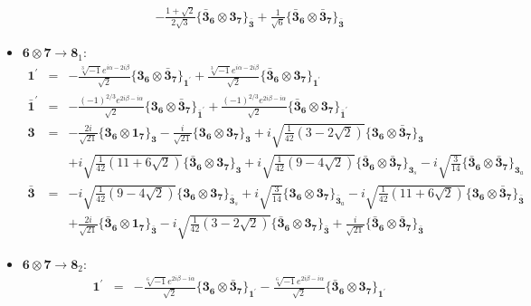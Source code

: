 \documentclass[english]{article}
\newcommand{\subcg}[3]{\big\{ {#1}\otimes{#2}\big\}^{}_{#3}}
\newcommand{\rep}[1]{\mathbf{#1}}
\begin{document}
\begin{itemize}
\begin{eqnarray*}
 & & -\frac{1+\sqrt{2}}{2 \sqrt{3}}\subcg{\rep{\bar{3}}_{\rep{6}}}{\rep{3}_{\rep{7}}}{\rep{\bar{3}}}+\frac{1}{\sqrt{6}}\subcg{\rep{\bar{3}}_{\rep{6}}}{\rep{\bar{3}}_{\rep{7}}}{\rep{\bar{3}}}
\end{eqnarray*}
\item $\rep{6}\otimes\rep{7}\to\rep{8}_{1}$:
\begin{eqnarray*}
\rep{1^{\prime}} &=& -\frac{\sqrt[3]{-1} e^{i \alpha -2 i \beta }}{\sqrt{2}}\subcg{\rep{3}_{\rep{6}}}{\rep{\bar{3}}_{\rep{7}}}{\rep{1^{\prime}}}+\frac{\sqrt[3]{-1} e^{i \alpha -2 i \beta }}{\sqrt{2}}\subcg{\rep{\bar{3}}_{\rep{6}}}{\rep{3}_{\rep{7}}}{\rep{1^{\prime}}}
\\
\rep{\bar{1}^{\prime}} &=& -\frac{(-1)^{2/3} e^{2 i \beta -i \alpha }}{\sqrt{2}}\subcg{\rep{3}_{\rep{6}}}{\rep{\bar{3}}_{\rep{7}}}{\rep{\bar{1}^{\prime}}}+\frac{(-1)^{2/3} e^{2 i \beta -i \alpha }}{\sqrt{2}}\subcg{\rep{\bar{3}}_{\rep{6}}}{\rep{3}_{\rep{7}}}{\rep{\bar{1}^{\prime}}}
\\
\rep{3} &=& -\frac{2 i}{\sqrt{21}}\subcg{\rep{3}_{\rep{6}}}{\rep{1}_{\rep{7}}}{\rep{3}}-\frac{i}{\sqrt{21}}\subcg{\rep{3}_{\rep{6}}}{\rep{3}_{\rep{7}}}{\rep{3}}+i \sqrt{\frac{1}{42} \left(3-2 \sqrt{2}\right)}\subcg{\rep{3}_{\rep{6}}}{\rep{\bar{3}}_{\rep{7}}}{\rep{3}} \\ 
 & & +i \sqrt{\frac{1}{42} \left(11+6 \sqrt{2}\right)}\subcg{\rep{\bar{3}}_{\rep{6}}}{\rep{3}_{\rep{7}}}{\rep{3}}+i \sqrt{\frac{1}{42} \left(9-4 \sqrt{2}\right)}\subcg{\rep{\bar{3}}_{\rep{6}}}{\rep{\bar{3}}_{\rep{7}}}{\rep{3}_{s}}-i \sqrt{\frac{3}{14}}\subcg{\rep{\bar{3}}_{\rep{6}}}{\rep{\bar{3}}_{\rep{7}}}{\rep{3}_{a}}
\\
\rep{\bar{3}} &=& -i \sqrt{\frac{1}{42} \left(9-4 \sqrt{2}\right)}\subcg{\rep{3}_{\rep{6}}}{\rep{3}_{\rep{7}}}{\rep{\bar{3}}_{s}}+i \sqrt{\frac{3}{14}}\subcg{\rep{3}_{\rep{6}}}{\rep{3}_{\rep{7}}}{\rep{\bar{3}}_{a}}-i \sqrt{\frac{1}{42} \left(11+6 \sqrt{2}\right)}\subcg{\rep{3}_{\rep{6}}}{\rep{\bar{3}}_{\rep{7}}}{\rep{\bar{3}}} \\ 
 & & +\frac{2 i}{\sqrt{21}}\subcg{\rep{\bar{3}}_{\rep{6}}}{\rep{1}_{\rep{7}}}{\rep{\bar{3}}}-i \sqrt{\frac{1}{42} \left(3-2 \sqrt{2}\right)}\subcg{\rep{\bar{3}}_{\rep{6}}}{\rep{3}_{\rep{7}}}{\rep{\bar{3}}}+\frac{i}{\sqrt{21}}\subcg{\rep{\bar{3}}_{\rep{6}}}{\rep{\bar{3}}_{\rep{7}}}{\rep{\bar{3}}}
\end{eqnarray*}
\item $\rep{6}\otimes\rep{7}\to\rep{8}_{2}$:
\begin{eqnarray*}
\rep{1^{\prime}} &=& -\frac{\sqrt[6]{-1} e^{2 i \beta -i \alpha }}{\sqrt{2}}\subcg{\rep{3}_{\rep{6}}}{\rep{\bar{3}}_{\rep{7}}}{\rep{1^{\prime}}}-\frac{\sqrt[6]{-1} e^{2 i \beta -i \alpha }}{\sqrt{2}}\subcg{\rep{\bar{3}}_{\rep{6}}}{\rep{3}_{\rep{7}}}{\rep{1^{\prime}}}

\end{eqnarray*}
\end{itemize}
\end{document}

